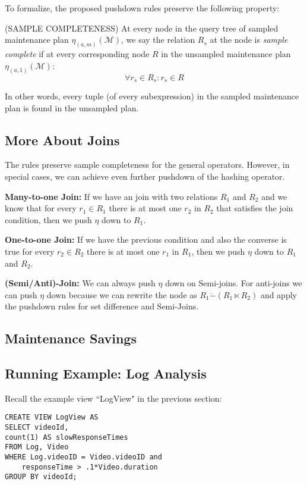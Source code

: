 To formalize, the proposed pushdown rules preserve the following property:
\begin{proposition} (SAMPLE COMPLETENESS) At every node in the query tree of sampled maintenance plan $\eta_{(a,m)}(\mathcal{M})$, we say the relation $R_s$ at the node is \emph{sample complete} if at every corresponding node $R$ in the unsampled maintenance plan $\eta_{(a,1)}(\mathcal{M})$:
\[ \forall r_s \in R_s : r_s \in R \]
\end{proposition}
In other words, every tuple (of every subexpression) in the sampled maintenance plan is found in the unsampled plan. 

\subsection{More About Joins}
The rules preserve sample completeness for the general operators. 
However, in special cases, we can achieve even further pushdown of the hashing operator. 

\textbf{Many-to-one Join: } If we have an join with two relations $R_1$ and $R_2$ and we know that for every $r_1 \in R_1$ there is at most one $r_2$ in $R_2$ that satisfies the join condition, then we push $\eta$ down to $R_1$.

\textbf{One-to-one Join: } If we have the previous condition and also the converse is true for every $r_2 \in R_2$ there is at most one $r_1$ in $R_1$, then we push $\eta$ down to $R_1$ and $R_2$.

\textbf{(Semi/Anti)-Join: } We can always push $\eta$ down on Semi-joins. For anti-joins we can push $\eta$ down because we can rewrite the node as $R_1 \dot{-} (R_1 \ltimes R_2) $ and apply the pushdown rules for set difference and Semi-Joins.

\subsection{Maintenance Savings}

\subsection{Running Example: Log Analysis}
Recall the example view ``LogView" in the previous section:
\begin{lstlisting} 
CREATE VIEW LogView AS 
SELECT videoId, 
count(1) AS slowResponseTimes 
FROM Log, Video
WHERE Log.videoID = Video.videoID and
    responseTime > .1*Video.duration
GROUP BY videoId;
\end{lstlisting}

